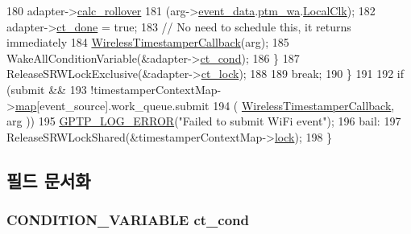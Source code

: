 \begin{DoxyCode}
180                 adapter->\hyperlink{class_intel_wireless_adapter_a697968213113c89339437ec1a297291a}{calc\_rollover}
181                 (arg->\hyperlink{struct_wireless_timestamper_callback_arg_a0cb3aa66097f2f3c9bafc9aeb88b4c9c}{event\_data}.\hyperlink{union_time_sync_event_data_ab4125e6fe4a30fb6626b81a6a66b7413}{ptm\_wa}.\hyperlink{struct___w_i_r_e_l_e_s_s___c_o_r_r_e_l_a_t_e_d_t_i_m_e_a18b6219538a583d472d0057f0828b35e}{LocalClk});
182             adapter->\hyperlink{class_intel_wireless_adapter_ab7386280881b5fe0d79562d65f42152b}{ct\_done} = \textcolor{keyword}{true};
183             \textcolor{comment}{// No need to schedule this, it returns immediately}
184             \hyperlink{windows__hal_8cpp_af2bed527a2a14e4a742ec5d88f75bb5f}{WirelessTimestamperCallback}(arg);
185             WakeAllConditionVariable(&adapter->\hyperlink{class_intel_wireless_adapter_abf7f0ddf827ae4bd5c82ab47f06e5328}{ct\_cond});
186         \}
187         ReleaseSRWLockExclusive(&adapter->\hyperlink{class_intel_wireless_adapter_a5fa67f021cca2b2c598bbc494b119fe9}{ct\_lock});
188 
189         \textcolor{keywordflow}{break};
190     \}
191 
192     \textcolor{keywordflow}{if} (submit &&
193         !timestamperContextMap->\hyperlink{class_locked_timestamper_context_map_a8880e18111e491249278c4cebf453b97}{map}[event\_source].work\_queue.submit
194         ( \hyperlink{windows__hal_8cpp_af2bed527a2a14e4a742ec5d88f75bb5f}{WirelessTimestamperCallback}, arg ))
195         \hyperlink{gptp__log_8hpp_afefbb1009717c128012bfeed94842987}{GPTP\_LOG\_ERROR}(\textcolor{stringliteral}{"Failed to submit WiFi event"});
196 bail:
197     ReleaseSRWLockShared(&timestamperContextMap->\hyperlink{class_locked_timestamper_context_map_afed18a2dbad108768defb51810a7a760}{lock});
198 \}
\end{DoxyCode}


\subsection{필드 문서화}
\subsubsection[{\texorpdfstring{ct\+\_\+cond}{ct_cond}}]{\setlength{\rightskip}{0pt plus 5cm}C\+O\+N\+D\+I\+T\+I\+O\+N\+\_\+\+V\+A\+R\+I\+A\+B\+LE ct\+\_\+cond\hspace{0.3cm}{\ttfamily [private]}}\hypertarget{class_intel_wireless_adapter_abf7f0ddf827ae4bd5c82ab47f06e5328}{}\label{class_intel_wireless_adapter_abf7f0ddf827ae4bd5c82ab47f06e5328}


